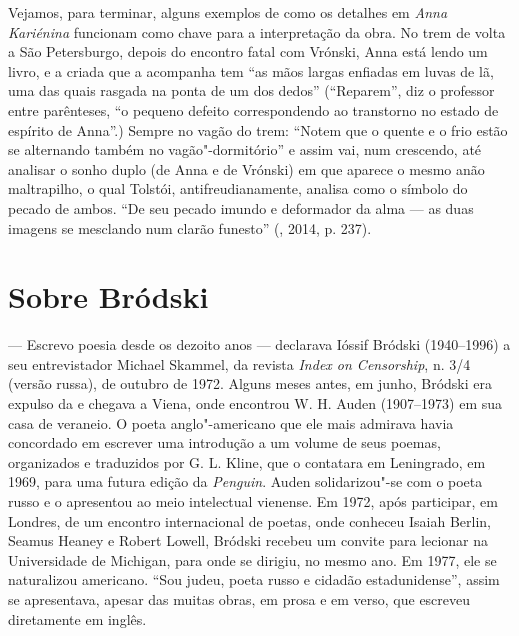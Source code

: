 Vejamos, para terminar, alguns exemplos de como os detalhes em
\emph{Anna Kariénina} funcionam como chave para a
interpretação da obra. No trem de volta a São Petersburgo, depois do
encontro fatal com Vrónski, Anna está lendo um livro, e a criada que a
acompanha tem ``as mãos largas enfiadas em luvas de lã, uma das quais
rasgada na ponta de um dos dedos'' (``Reparem'', diz o
professor entre parênteses, ``o pequeno defeito
correspondendo ao transtorno no estado de espírito de Anna''.)
Sempre no vagão do trem: ``Notem que o quente e o frio estão se
alternando também no vagão"-dormitório'' e assim vai, num crescendo, até
analisar o sonho duplo (de Anna e de Vrónski) em que aparece o mesmo
anão maltrapilho, o qual Tolstói, antifreudianamente, analisa como o
símbolo do pecado de ambos. ``De seu pecado imundo e deformador da alma
--- as duas imagens se mesclando num clarão funesto'' (, 2014, p. 237).

\chapter{Sobre Bródski}
\label{brodski}

--- Escrevo poesia desde os dezoito anos --- declarava Ióssif Bródski
(1940--1996) a seu entrevistador Michael Skammel, da revista \emph{Index
on Censorship}, n. 3/4 (versão russa), de outubro de 1972. Alguns meses
antes, em junho, Bródski era expulso da  e chegava a Viena, onde
encontrou W. H. Auden (1907--1973) em sua casa de veraneio. O poeta
anglo"-americano que ele mais admirava havia concordado em escrever
uma introdução a um volume de seus poemas, organizados e traduzidos por
G. L. Kline, que o contatara em Leningrado, em 1969, para uma
futura edição da \emph{Penguin}. Auden solidarizou"-se com o poeta russo e o apresentou ao
meio intelectual vienense. Em 1972, após participar, em Londres, de um
encontro internacional de poetas, onde conheceu Isaiah Berlin, Seamus
Heaney e Robert Lowell, Bródski recebeu um convite para lecionar na
Universidade de Michigan, para onde se dirigiu, no mesmo ano. Em
1977, ele se naturalizou americano. ``Sou judeu, poeta russo e cidadão
estadunidense'', assim se apresentava, apesar das muitas obras, em
prosa e em verso, que escreveu diretamente em inglês.

